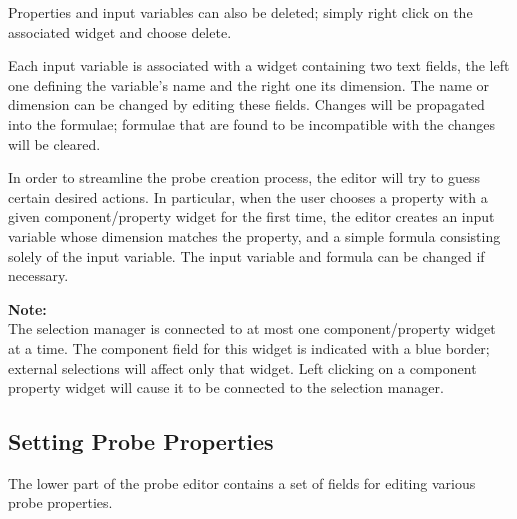 \documentclass{article}
\begin{document}
Properties and input variables can also be deleted; simply right
click on the associated widget and choose {\sf delete}.

Each input variable is associated with a widget containing two text
fields, the left one defining the variable's name and the right one
its dimension.  The name or dimension can be changed by editing these
fields. Changes will be propagated into the formulae; formulae that
are found to be incompatible with the changes will be cleared.

In order to streamline the probe creation process, the editor will try
to guess certain desired actions.  In particular, when the user
chooses a property with a given component/property widget for the
first time, the editor creates an input variable whose dimension
matches the property, and a simple formula consisting solely
of the input variable. The input variable and formula can be changed if
necessary.

\begin{sideblock}
{\bf Note:}\\
The selection manager is connected to at most one
component/property widget at a time. The component field for this
widget is indicated with a blue border; external selections will
affect only that widget. Left clicking on a component property widget
will cause it to be connected to the selection manager.
\end{sideblock}

\subsection{Setting Probe Properties}
\label{settingProbePropertiesSec}

The lower part of the probe editor contains a set of fields for
editing various probe properties.
\end{document}
